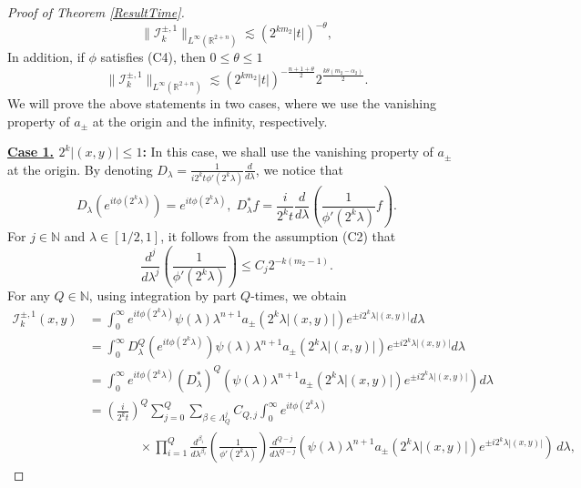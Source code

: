 \documentclass[a4paper,11pt, reqno]{amsart}
\numberwithin{equation}{section}
\theoremstyle{plain}
\theoremstyle{definition}
\theoremstyle{remark}
\begin{document}
\begin{proof}[Proof of Theorem \ref{ResultTime}]
\begin{equation}
	\|\mathcal{I}^{\pm,1}_k\|_{L^\infty(\mathbb{R}^{2+n})}\lesssim \left(2^{km_2}|t|\right)^{-\theta}\label{11a},
	\end{equation}
 In addition, if $\phi$ satisfies (C4), then $0 \leq \theta \leq 1$
 \begin{equation}
	\|\mathcal{I}^{\pm,1}_k\|_{L^\infty(\mathbb{R}^{2+n})} \lesssim  \left(2^{km_2}|t|\right)^{-\frac{n+1+\theta}{2}}2^{\frac{k\theta(m_2-\alpha_2)}{2}}.\label{11aa}
	\end{equation}
We will prove the above statements in two cases, where we use the vanishing property of $a_\pm$ at the origin and the infinity, respectively.

\textbf{\underline{Case 1.} $2^k|(x,y)|\leq 1$:} In this case, we shall use the vanishing property of $a_\pm$ at the origin. 
By denoting $D_\lambda=\frac{1}{i2^kt\phi'(2^k\lambda)}\frac{d}{d\lambda}$, we notice that
\begin{equation*}
D_\lambda\left(e^{it\phi(2^k\lambda)}\right)=e^{it\phi(2^k\lambda)}, \; D_\lambda^*f=\frac{i}{2^kt}\frac{d}{d\lambda}\left(\frac{1}{\phi'(2^k\lambda)}f\right).
\end{equation*}
For $j \in\mathbb{N}$ and $\lambda\in [1/2,1]$, it follows from the assumption (C2) that
\begin{equation}\label{phase-prime}
 \frac{d^j}{d\lambda^j}\left(\frac{1}{\phi'(2^k\lambda)}\right)\leq C_j 2^{-k(m_2-1)}.
\end{equation}
For any $Q\in \mathbb N$, using integration by part $Q$-times, we obtain
 \begin{equation*}
	\begin{aligned}
	\mathcal{I}_k^{\pm,1}(x,y)&=\int_0^\infty e^{it\phi(2^k\lambda)} \psi(\lambda)\lambda^{n+1}a_{\pm}(2^k\lambda|(x,y)|)e^{\pm i2^k\lambda|(x,y)|}d\lambda\\
    &=\int_0^\infty D^Q_\lambda\left(e^{it\phi(2^k\lambda)}\right)\psi(\lambda)\lambda^{n+1}a_{\pm}(2^k\lambda|(x,y)|)e^{\pm i2^k\lambda|(x,y)|}d\lambda\\
    &=\int_0^\infty e^{it\phi(2^k\lambda)}\left(D_\lambda^*\right)^Q\left(\psi(\lambda)\lambda^{n+1}a_{\pm}(2^k\lambda|(x,y)|)e^{\pm i2^k\lambda|(x,y)|}\right)d\lambda\\
    &=\left(\frac{i}{2^kt}\right)^{ Q}\sum_{j=0}^Q\sum_{\beta\in \Lambda_Q^j} C_{Q,j}\int_0^\infty  e^{it\phi(2^k\lambda)}\\
     &\qquad \qquad\times \prod_{i=1}^Q\frac{d^{\beta_i}}{d\lambda^{\beta_i}}\left(\frac{1}{\phi'(2^k\lambda)}\right)\frac{d^{Q-j}}{d\lambda^{Q-j}}\left(\psi(\lambda)\lambda^{n+1}a_{\pm}(2^k\lambda|(x,y)|)e^{\pm i2^k\lambda|(x,y)|} \right)\,d\lambda, 

\end{aligned}
\end{equation*}
\end{proof}
\end{document}

